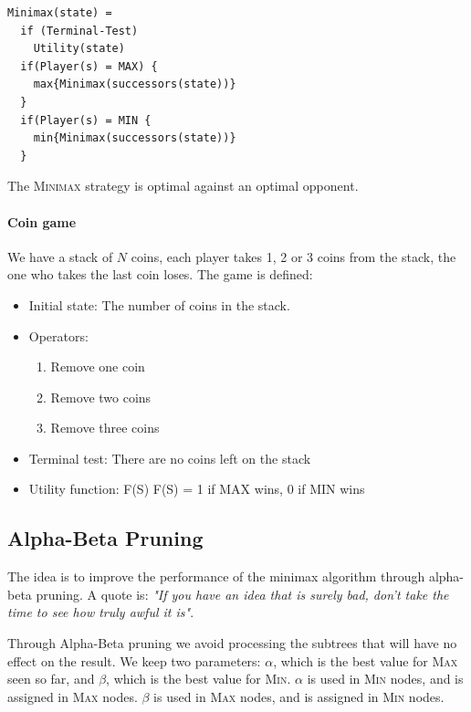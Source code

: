 \documentclass{article}
\begin{document}
\begin{lstlisting}[inputencoding=utf8/latin1, keywordstyle=\color{blue}\bfseries, rulecolor=\color{black}]
Minimax(state) =
  if (Terminal-Test)
    Utility(state)
  if(Player(s) = MAX) {
    max{Minimax(successors(state))}
  }
  if(Player(s) = MIN {
    min{Minimax(successors(state))}
  }
\end{lstlisting}

The \textsc{Minimax} strategy is optimal against an optimal opponent. 

\paragraph{Coin game}%
\label{par:coin_game}

We have a stack of $N$ coins, each player takes 1, 2 or 3 coins from the stack,
the one who takes the last coin loses. The game is defined:

\begin{itemize}
  \item Initial state: The number of coins in the stack.
  \item Operators:
    \begin{enumerate}
      \item Remove one coin 
      \item Remove two coins 
      \item Remove three coins
    \end{enumerate}
  \item Terminal test: There are no coins left on the stack
  \item Utility function: F(S)
    \subitem F(S) = 1 if MAX wins, 0 if MIN wins
\end{itemize}

\subsection{Alpha-Beta Pruning}%
\label{sub:alpha_beta_pruning}

The idea is to improve the performance of the minimax algorithm through
alpha-beta pruning. A quote is: \textit{"If you have an idea that is surely bad,
don't take the time to see how truly awful it is"}.

Through Alpha-Beta pruning we avoid processing the subtrees that will have no
effect on the result. We keep two parameters: $\alpha$, which is the best value
for \textsc{Max} seen so far, and $\beta$, which is the best value for
\textsc{Min}. $\alpha$ is used in \textsc{Min} nodes, and is assigned in
\textsc{Max} nodes. $\beta$ is used in \textsc{Max} nodes, and is assigned in
\textsc{Min} nodes.
\end{document}
